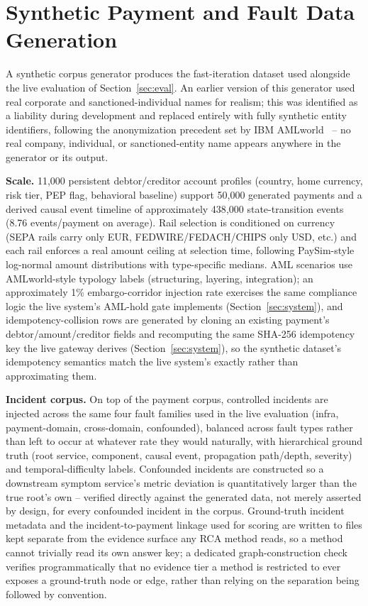 \documentclass[conference]{IEEEtran}
\begin{document}
\section{Synthetic Payment and Fault Data Generation}
\label{sec:data}

A synthetic corpus generator produces the fast-iteration dataset used
alongside the live evaluation of Section~\ref{sec:eval}. An earlier version
of this generator used real corporate and sanctioned-individual names for
realism; this was identified as a liability during development and
replaced entirely with fully synthetic entity identifiers, following the
anonymization precedent set by IBM AMLworld~\cite{amlworld2023} -- no real
company, individual, or sanctioned-entity name appears anywhere in the
generator or its output.

\textbf{Scale.} 11{,}000 persistent debtor/creditor account profiles
(country, home currency, risk tier, PEP flag, behavioral baseline) support
50{,}000 generated payments and a derived causal event timeline of
approximately 438{,}000 state-transition events (8.76 events/payment on
average). Rail selection is conditioned on currency (SEPA rails carry only
EUR, FEDWIRE/FEDACH/CHIPS only USD, etc.) and each rail enforces a real
amount ceiling at selection time, following PaySim-style~\cite{paysim2016}
log-normal amount distributions with type-specific medians. AML scenarios
use AMLworld-style typology labels (structuring, layering, integration);
an approximately 1\% embargo-corridor injection rate exercises the same
compliance logic the live system's AML-hold gate implements
(Section~\ref{sec:system}), and idempotency-collision rows are generated by
cloning an existing payment's debtor/amount/creditor fields and
recomputing the same SHA-256 idempotency key the live gateway derives
(Section~\ref{sec:system}), so the synthetic dataset's idempotency
semantics match the live system's exactly rather than approximating them.

\textbf{Incident corpus.} On top of the payment corpus, controlled
incidents are injected across the same four fault families used in the
live evaluation (infra, payment-domain, cross-domain, confounded),
balanced across fault types rather than left to occur at whatever rate
they would naturally, with hierarchical ground truth (root service,
component, causal event, propagation path/depth, severity) and
temporal-difficulty labels. Confounded incidents are constructed so a
downstream symptom service's metric deviation is quantitatively larger
than the true root's own -- verified directly against the generated data,
not merely asserted by design, for every confounded incident in the
corpus. Ground-truth incident metadata and the incident-to-payment linkage
used for scoring are written to files kept separate from the evidence
surface any RCA method reads, so a method cannot trivially read its own
answer key; a dedicated graph-construction check verifies programmatically
that no evidence tier a method is restricted to ever exposes a ground-truth
node or edge, rather than relying on the separation being followed by
convention.
\end{document}

